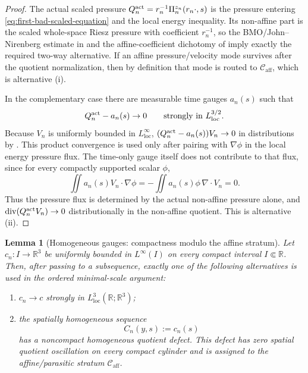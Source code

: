 \documentclass[11pt]{amsart}
\numberwithin{equation}{section}
\theoremstyle{plain}
\newtheorem{lemma}[lemma]{Lemma}
\theoremstyle{definition}
\theoremstyle{remark}
\newcommand{\loc}{\mathrm{loc}}
\newcommand{\divergence}{\operatorname{div}}
\newcommand{\Caff}{\mathcal C_{\mathrm{aff}}}
\begin{document}
\begin{proof}
The actual scaled pressure \(Q_n^{\rm act}=r_n^{-1}\Pi_n^{z_n}(r_n\cdot,s)\)
is the pressure entering \eqref{eq:first-bad-scaled-equation} and the local
energy inequality.  Its non-affine part is the scaled whole-space Riesz
pressure with coefficient \(r_n^{-1}\), so the BMO/John--Nirenberg estimate in
 and the affine-coefficient
dichotomy of  imply exactly the
      required two-way alternative.  If an affine pressure/velocity mode survives
after the quotient normalization, then by definition that mode is routed to
\(\Caff\), which is alternative \textup{(i)}.

In the complementary case there are measurable time gauges \(a_n(s)\) such
that
\[
   Q_n^{\rm act}-a_n(s)\to0
   \qquad\hbox{strongly in }L^{3/2}_{\rm loc}.
\]
Because \(V_n\) is uniformly bounded in \(L^\infty_{\loc}\),
\((Q_n^{\rm act}-a_n(s))V_n\to0\) in distributions by
.  This product convergence is
used only after pairing with \(\nabla\phi\) in the local energy pressure flux.  The
time-only gauge itself does not contribute to that flux, since for every compactly
supported scalar \(\phi\),
\[
   \iint a_n(s)V_n\cdot\nabla\phi
   =-\iint a_n(s)\phi\,\nabla\cdot V_n=0.
\]
Thus the pressure flux is determined by the actual non-affine pressure alone,
and \(\divergence(Q_n^{\rm act}V_n)\to0\) distributionally in the non-affine
quotient.  This is alternative
\textup{(ii)}.
\end{proof}

\begin{lemma}[Homogeneous gauges: compactness modulo the affine stratum]
\label{lem:homogeneous-gauge-compactness}
Let \(c_n:I\to\mathbb R^3\) be uniformly bounded in \(L^\infty(I)\) on every
compact interval \(I\Subset\mathbb R\).  Then, after passing to a subsequence,
exactly one of the following alternatives is used in the ordered minimal-scale
argument:
\begin{enumerate}[label=\textup{(\roman*)}]
   \item \(c_n\to c\) strongly in \(L^3_{\loc}(\mathbb R;\mathbb R^3)\);
   \item the spatially homogeneous sequence
   \[
      C_n(y,s):=c_n(s)
   \]
   has a noncompact homogeneous quotient defect.  This defect has zero spatial
   quotient oscillation on every compact cylinder and is assigned to the
   affine/parasitic stratum \(\Caff\).
\end{enumerate}
\end{lemma}
\end{document}
